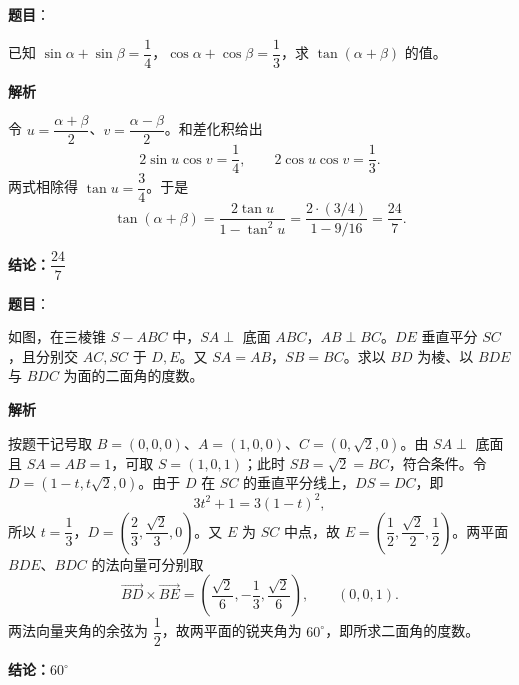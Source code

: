 \begin{answer}

\textbf{题目}：

已知 $\sin\alpha+\sin\beta=\dfrac14$，$\cos\alpha+\cos\beta=\dfrac13$，求 $\tan(\alpha+\beta)$ 的值。

\textbf{解析}

令 $u=\dfrac{\alpha+\beta}{2}$、$v=\dfrac{\alpha-\beta}{2}$。和差化积给出
\nopagebreak[4]
\[
2\sin u\cos v=\frac14,\qquad
2\cos u\cos v=\frac13.
\]
两式相除得 $\tan u=\dfrac34$。于是
\nopagebreak[4]
\[
\tan(\alpha+\beta)
=\frac{2\tan u}{1-\tan^2u}
=\frac{2\cdot(3/4)}{1-9/16}
=\frac{24}{7}.
\]

\textbf{结论：$\dfrac{24}{7}$}


\end{answer}
\begin{answer}

\textbf{题目}：

如图，在三棱锥 $S-ABC$ 中，$SA\perp$ 底面 $ABC$，$AB\perp BC$。$DE$ 垂直平分 $SC$，且分别交 $AC,SC$ 于 $D,E$。又 $SA=AB$，$SB=BC$。求以 $BD$ 为棱、以 $BDE$ 与 $BDC$ 为面的二面角的度数。
\nopagebreak[4]
\begin{center}\end{center}
\nopagebreak[4]
\textbf{解析}

按题干记号取 $B=(0,0,0)$、$A=(1,0,0)$、$C=(0,\sqrt2,0)$。由 $SA\perp$ 底面且 $SA=AB=1$，可取 $S=(1,0,1)$；此时 $SB=\sqrt2=BC$，符合条件。令 $D=(1-t,t\sqrt2,0)$。由于 $D$ 在 $SC$ 的垂直平分线上，$DS=DC$，即
\nopagebreak[4]
\[
3t^2+1=3(1-t)^2,
\]
所以 $t=\dfrac13$，$D=(\dfrac23,\dfrac{\sqrt2}{3},0)$。又 $E$ 为 $SC$ 中点，故 $E=(\dfrac12,\dfrac{\sqrt2}{2},\dfrac12)$。两平面 $BDE$、$BDC$ 的法向量可分别取
\nopagebreak[4]
\[
\overrightarrow{BD}\times\overrightarrow{BE}
=\left(\frac{\sqrt2}{6},-\frac13,\frac{\sqrt2}{6}\right),
\qquad (0,0,1).
\]
两法向量夹角的余弦为 $\dfrac12$，故两平面的锐夹角为 $60^\circ$，即所求二面角的度数。

\textbf{结论：$60^\circ$}


\end{answer}
